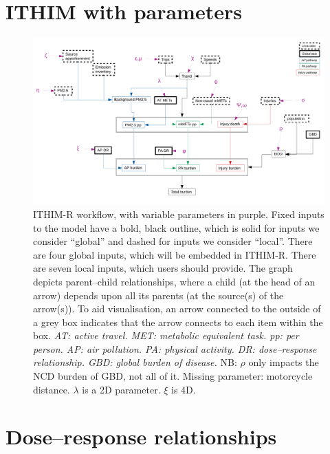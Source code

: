 \documentclass{article}
\begin{document}
\begin{appendix}

\section{ITHIM with parameters}

\begin{figure}[h]
  \centering
  \includegraphics[width=\textwidth]{ithim_with_parameters.pdf}
  \caption{\small ITHIM-R workflow, with variable parameters in purple. Fixed inputs to the model have a bold, black outline, which is solid for inputs we consider ``global'' and dashed for inputs we consider ``local''. There are four global inputs, which will be embedded in ITHIM-R. There are seven local inputs, which users should provide. The graph depicts parent--child relationships, where a child (at the head of an arrow) depends upon all its parents (at the source(s) of the arrow(s)). To aid visualisation, an arrow connected to the outside of a grey box indicates that the arrow connects to each item within the box. \textit{AT: active travel. MET: metabolic equivalent task. pp: per person. AP: air pollution. PA: physical activity. DR: dose--response relationship. GBD: global burden of disease.} NB: $\rho$ only impacts the NCD burden of GBD, not all of it. Missing parameter: motorcycle distance. $\lambda$ is a 2D parameter. $\xi$ is 4D.}
\label{ithim_with_parameters}
\end{figure}

\clearpage
\section{Dose--response relationships}


\end{appendix}
\end{document}
